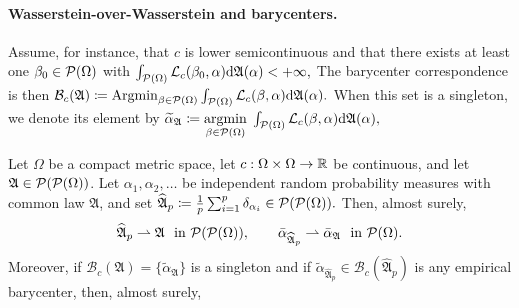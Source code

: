\paragraph{Wasserstein-over-Wasserstein and barycenters.}
Assume, for instance, that $c$ is lower semicontinuous and that there exists at least one $\beta_0\in\mathcal{P}(\Omega)$ with \(\int_{\mathcal{P}(\Omega)}\mathcal{L}_c(\beta_0,\alpha)\mathrm{d}\mathfrak A(\alpha)<+\infty,\)
The barycenter correspondence is then
\(\mathcal B_c(\mathfrak A) \coloneqq \operatorname*{Argmin}_{\beta\in\mathcal{P}(\Omega)} \int_{\mathcal{P}(\Omega)}\mathcal{L}_c(\beta,\alpha)\mathrm{d}\mathfrak A(\alpha).\)
When this set is a singleton, we denote its element by \(\widetilde\alpha_{\mathfrak A} \coloneqq \underset{\beta\in\mathcal{P}(\Omega)}{\operatorname{argmin}}\; \int_{\mathcal{P}(\Omega)}\mathcal{L}_c(\beta,\alpha)\mathrm{d}\mathfrak A(\alpha),\)
\begin{prop}\label{prop-wow-barycenter-lln}
Let $\Omega$ be a compact metric space, let $c:\Omega\times\Omega\to\mathbb{R}$ be continuous, and let $\mathfrak A\in\mathcal{P}(\mathcal{P}(\Omega))$. Let $\alpha_1,\alpha_2,\ldots$ be independent random probability measures with common law $\mathfrak A$, and set
\(\widehat{\mathfrak A}_p \coloneqq \frac1p\sum_{i=1}^p\delta_{\alpha_i} \in\mathcal{P}(\mathcal{P}(\Omega)).\)
Then, almost surely,
\begin{equation}\label{eq-wow-empirical-law-lln}
\widehat{\mathfrak A}_p \rightharpoonup \mathfrak A\ \text{ in }\mathcal{P}(\mathcal{P}(\Omega)),
\qquad
\bar\alpha_{\widehat{\mathfrak A}_p}\rightharpoonup\bar\alpha_{\mathfrak A}\ \text{ in }\mathcal{P}(\Omega).
\end{equation}
Moreover, if $\mathcal B_c(\mathfrak A)=\{\widetilde\alpha_{\mathfrak A}\}$ is a singleton and if $\widetilde\alpha_{\widehat{\mathfrak A}_p}\in\mathcal B_c(\widehat{\mathfrak A}_p)$ is any empirical barycenter, then, almost surely,
\end{prop}
